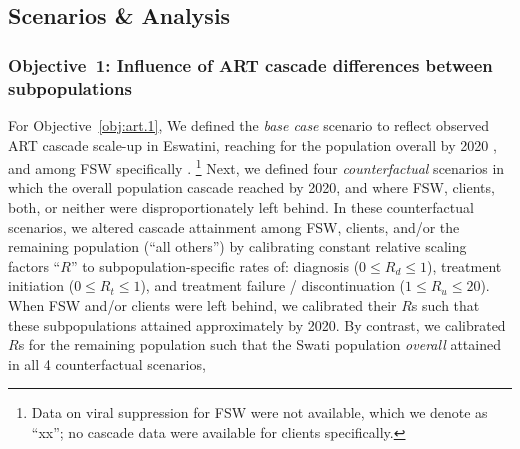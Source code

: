 \subsection{Scenarios \& Analysis}\label{art.meth.obj}
\subsubsection{Objective~1: Influence of ART cascade differences between subpopulations}\label{art.meth.obj.1}
For Objective~\ref{obj:art.1},
We defined the \emph{base case} scenario to reflect
observed ART cascade scale-up in Eswatini, reaching
\cashi for the population overall by 2020 \cite{SHIMS3}, and
\casfsw among FSW specifically \cite{EswIBBS2022}.%
\footnote{Data on viral suppression for FSW were not available, which we denote as ``xx'';
  no cascade data were available for clients specifically.}
Next, we defined four \emph{counterfactual} scenarios in which
the overall population cascade reached \casmd by 2020,
and where FSW, clients, both, or neither were disproportionately left behind.
In these counterfactual scenarios, we altered cascade attainment among
FSW, clients, and/or the remaining population (``all others'') by calibrating
constant relative scaling factors ``$R$'' to subpopulation-specific rates of:
diagnosis ($0 \le R_d \le 1$),
treatment initiation ($0 \le R_t \le 1$), and
treatment failure / discontinuation ($1 \le R_u \le 20$).
When FSW and/or clients were left behind, we calibrated their $R$s such that
these subpopulations attained approximately \caslo by 2020.
By contrast, we calibrated $R$s for the remaining population such that
the Swati population \emph{overall} attained \casmd in all 4 counterfactual scenarios,
